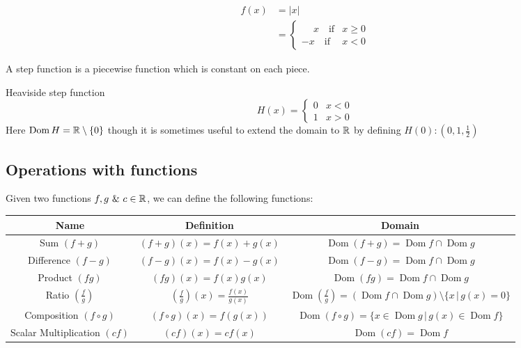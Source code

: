\documentclass[10pt, a4paper]{article}
\DeclareMathOperator{\Dom}{Dom}
\begin{document}
\begin{example}
    \begin{align*}
        f(x) &= |x| \\
        &= \begin{cases}
            \phantom{-}x\quad \text{if} &x \geq 0 \\
            -x\quad \text{if} &x < 0
        \end{cases}
    \end{align*}
\end{example}

A step function is a piecewise function which is constant on each piece.
\begin{example}
    Heaviside step function
    \[
    H(x) = \begin{cases}
        0 & x < 0 \\
        1 & x > 0
    \end{cases}
    \]
    Here $\Dom H = \R \setminus \{0\}$ though it is sometimes useful to extend the domain to $\mathbb{R}$ by defining $H(0): (0, 1, \frac{1}{2})$
\end{example}

\subsection{Operations with functions}
Given two functions $f, g\  \&\  c \in \mathbb{R}$, we can define the following functions:
\begin{table}[h!]
    \centering
    \begin{tabular}{|c|c|c|}
        \hline
        Name & Definition & Domain \\
        \hline
        Sum $(f + g)$ & $(f + g)(x) = f(x) + g(x)$ & $\Dom (f + g) = \Dom f \cap \Dom g$ \\
        Difference $(f - g)$ & $(f - g)(x) = f(x) - g(x)$ & $\Dom (f - g) = \Dom f \cap \Dom g$ \\
        Product $(fg)$ & $(fg)(x) = f(x)g(x)$ & $\Dom (fg) = \Dom f \cap \Dom g$ \\
        Ratio $\left(\frac{f}{g}\right)$ & $\left(\frac{f}{g}\right)(x) = \frac{f(x)}{g(x)}$ & $\Dom \left(\frac{f}{g}\right) = (\Dom f \cap \Dom g) \setminus \{x\,|\,g(x) = 0\}$ \\
        Composition $(f\circ g)$ & $(f \circ g)(x) = f(g(x))$ & $\Dom (f \circ g) = \{x \in \Dom g\,|\, g(x) \in \Dom f\}$ \\
        Scalar Multiplication $(cf)$ & $(cf)(x) = cf(x)$ & $\Dom (cf) = \Dom f$ \\
        \hline
    \end{tabular}
\end{table}
\end{document}
